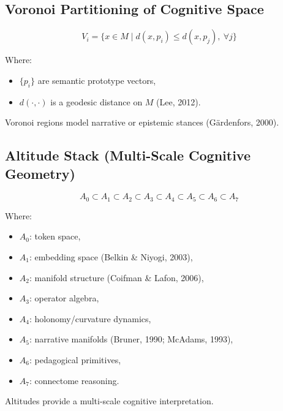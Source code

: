 
\subsection*{Voronoi Partitioning of Cognitive Space}
\[
V_i = \{ x \in M \mid d(x, p_i) \le d(x, p_j),\ \forall j \}
\]

Where:
\begin{itemize}[noitemsep]
    \item $\{p_i\}$ are semantic prototype vectors,
    \item $d(\cdot,\cdot)$ is a geodesic distance on $M$ (Lee, 2012).
\end{itemize}

Voronoi regions model narrative or epistemic stances (Gärdenfors, 2000).


\subsection*{Altitude Stack (Multi-Scale Cognitive Geometry)}
\[
A_0 \subset A_1 \subset A_2 \subset A_3 \subset A_4 \subset A_5 \subset A_6 \subset A_7
\]

Where:
\begin{itemize}[noitemsep]
    \item $A_0$: token space,
    \item $A_1$: embedding space (Belkin \& Niyogi, 2003),
    \item $A_2$: manifold structure (Coifman \& Lafon, 2006),
    \item $A_3$: operator algebra,
    \item $A_4$: holonomy/curvature dynamics,
    \item $A_5$: narrative manifolds (Bruner, 1990; McAdams, 1993),
    \item $A_6$: pedagogical primitives,
    \item $A_7$: connectome reasoning.
\end{itemize}

Altitudes provide a multi-scale cognitive interpretation.


